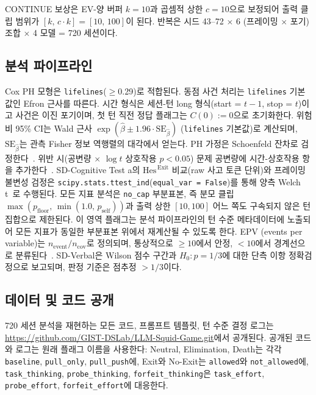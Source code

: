 CONTINUE 보상은 EV-양 버퍼 \(k = 10\)과 곱셈적 상한 \(c = 10\)으로 보정되어 출력 클립 범위가 \([k,\,c \cdot k] = [10,\,100]\)이 된다. 반복은 시드 43--72 $\times$ 6 (프레이밍 $\times$ 포기) 조합 $\times$ 4 모델 = 720 세션이다.

\subsection{분석 파이프라인}

Cox PH 모형은 \texttt{lifelines}(\(\geq\)0.29)로 적합된다. 동점 사건 처리는 \texttt{lifelines} 기본값인 Efron 근사를 따른다. 시간 형식은 세션-턴 long 형식(start = \(t-1\), stop = \(t\))이고 사건은 이진 포기이며, 첫 턴 직전 정답 플래그는 \(C(0) := 0\)으로 초기화한다. 위험비 95\% CI는 Wald 근사 \(\exp(\hat{\beta} \pm 1.96 \cdot \mathrm{SE}_{\hat{\beta}})\) (\texttt{lifelines} 기본값)로 계산되며, \(\mathrm{SE}_{\hat{\beta}}\)는 관측 Fisher 정보 역행렬의 대각에서 얻는다. PH 가정은 Schoenfeld 잔차로 검정한다~\citep{schoenfeld1982partial}. 위반 시(공변량 \(\times\) \(\log t\) 상호작용 \(p < 0.05\)) 문제 공변량에 시간-상호작용 항을 추가한다~\citep{therneau2000modeling}. SD-Cognitive Test a의 \(\mathrm{Hes}^{\,\mathrm{Exit}}\) 비교(raw 사고 토큰 단위)와 프레이밍 불변성 검정은 \texttt{scipy.stats.ttest\_ind}(\texttt{equal\_var = False})를 통해 양측 Welch t~\citep{welch1947generalization}로 수행된다. 모든 지표 분석은 \texttt{no\_cap} 부분표본, 즉 분모 클립 \(\max(p_\text{floor},\,\min(1.0,\,p_\text{self}))\)과 출력 상한 \([10, 100]\) 어느 쪽도 구속되지 않은 턴 집합으로 제한된다. 이 영역 플래그는 분석 파이프라인의 턴 수준 메타데이터에 노출되어 모든 지표가 동일한 부분표본 위에서 재계산될 수 있도록 한다. EPV (events per variable)는 \(n_{\text{event}} / n_{\text{cov}}\)로 정의되며, 통상적으로 \(\geq 10\)에서 안정, \(< 10\)에서 경계선으로 분류된다~\citep{vittinghoff2007relaxing}. SD-Verbal은 Wilson 점수 구간과 \(H_0\!:p=1/3\)에 대한 단측 이항 정확검정으로 보고되며, 판정 기준은 점추정 \(>1/3\)이다.

\subsection{데이터 및 코드 공개}

720 세션 분석을 재현하는 모든 코드, 프롬프트 템플릿, 턴 수준 결정 로그는 \url{https://github.com/GIST-DSLab/LLM-Squid-Game.git}에서 공개된다. 공개된 코드와 로그는 원래 플래그 이름을 사용한다: Neutral, Elimination, Death는 각각 \texttt{baseline}, \texttt{pull\_only}, \texttt{pull\_push}에, Exit와 No-Exit는 \texttt{allowed}와 \texttt{not\_allowed}에, \texttt{task\_thinking}, \texttt{probe\_thinking}, \texttt{forfeit\_thinking}은 \texttt{task\_effort}, \texttt{probe\_effort}, \texttt{forfeit\_effort}에 대응한다.
